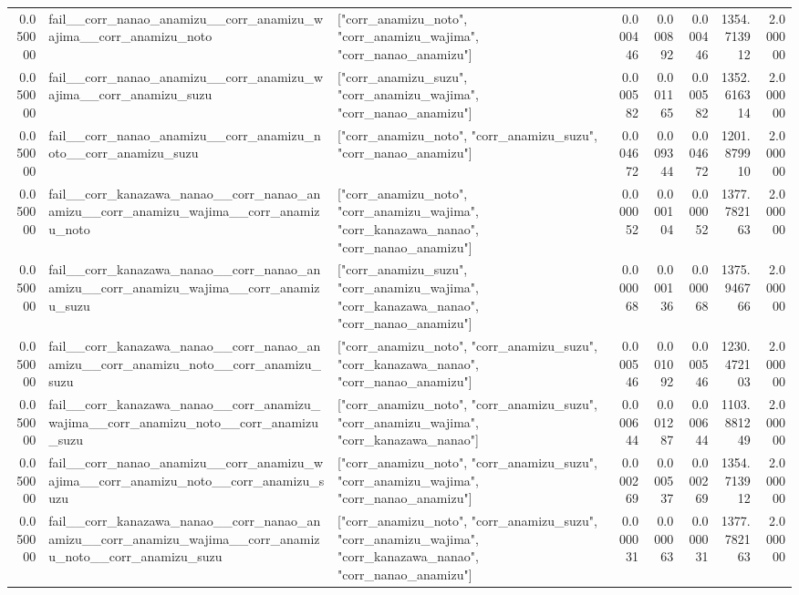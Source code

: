 \begin{tabular}{rllrrrrr}
0.050000 & fail\_\_corr\_nanao\_anamizu\_\_corr\_anamizu\_wajima\_\_corr\_anamizu\_noto & ["corr\_anamizu\_noto", "corr\_anamizu\_wajima", "corr\_nanao\_anamizu"] & 0.000446 & 0.000892 & 0.000446 & 1354.713912 & 2.000000 \\
0.050000 & fail\_\_corr\_nanao\_anamizu\_\_corr\_anamizu\_wajima\_\_corr\_anamizu\_suzu & ["corr\_anamizu\_suzu", "corr\_anamizu\_wajima", "corr\_nanao\_anamizu"] & 0.000582 & 0.001165 & 0.000582 & 1352.616314 & 2.000000 \\
0.050000 & fail\_\_corr\_nanao\_anamizu\_\_corr\_anamizu\_noto\_\_corr\_anamizu\_suzu & ["corr\_anamizu\_noto", "corr\_anamizu\_suzu", "corr\_nanao\_anamizu"] & 0.004672 & 0.009344 & 0.004672 & 1201.879910 & 2.000000 \\
0.050000 & fail\_\_corr\_kanazawa\_nanao\_\_corr\_nanao\_anamizu\_\_corr\_anamizu\_wajima\_\_corr\_anamizu\_noto & ["corr\_anamizu\_noto", "corr\_anamizu\_wajima", "corr\_kanazawa\_nanao", "corr\_nanao\_anamizu"] & 0.000052 & 0.000104 & 0.000052 & 1377.782163 & 2.000000 \\
0.050000 & fail\_\_corr\_kanazawa\_nanao\_\_corr\_nanao\_anamizu\_\_corr\_anamizu\_wajima\_\_corr\_anamizu\_suzu & ["corr\_anamizu\_suzu", "corr\_anamizu\_wajima", "corr\_kanazawa\_nanao", "corr\_nanao\_anamizu"] & 0.000068 & 0.000136 & 0.000068 & 1375.946766 & 2.000000 \\
0.050000 & fail\_\_corr\_kanazawa\_nanao\_\_corr\_nanao\_anamizu\_\_corr\_anamizu\_noto\_\_corr\_anamizu\_suzu & ["corr\_anamizu\_noto", "corr\_anamizu\_suzu", "corr\_kanazawa\_nanao", "corr\_nanao\_anamizu"] & 0.000546 & 0.001092 & 0.000546 & 1230.472103 & 2.000000 \\
0.050000 & fail\_\_corr\_kanazawa\_nanao\_\_corr\_anamizu\_wajima\_\_corr\_anamizu\_noto\_\_corr\_anamizu\_suzu & ["corr\_anamizu\_noto", "corr\_anamizu\_suzu", "corr\_anamizu\_wajima", "corr\_kanazawa\_nanao"] & 0.000644 & 0.001287 & 0.000644 & 1103.881249 & 2.000000 \\
0.050000 & fail\_\_corr\_nanao\_anamizu\_\_corr\_anamizu\_wajima\_\_corr\_anamizu\_noto\_\_corr\_anamizu\_suzu & ["corr\_anamizu\_noto", "corr\_anamizu\_suzu", "corr\_anamizu\_wajima", "corr\_nanao\_anamizu"] & 0.000269 & 0.000537 & 0.000269 & 1354.713912 & 2.000000 \\
0.050000 & fail\_\_corr\_kanazawa\_nanao\_\_corr\_nanao\_anamizu\_\_corr\_anamizu\_wajima\_\_corr\_anamizu\_noto\_\_corr\_anamizu\_suzu & ["corr\_anamizu\_noto", "corr\_anamizu\_suzu", "corr\_anamizu\_wajima", "corr\_kanazawa\_nanao", "corr\_nanao\_anamizu"] & 0.000031 & 0.000063 & 0.000031 & 1377.782163 & 2.000000 \\

\end{tabular}
